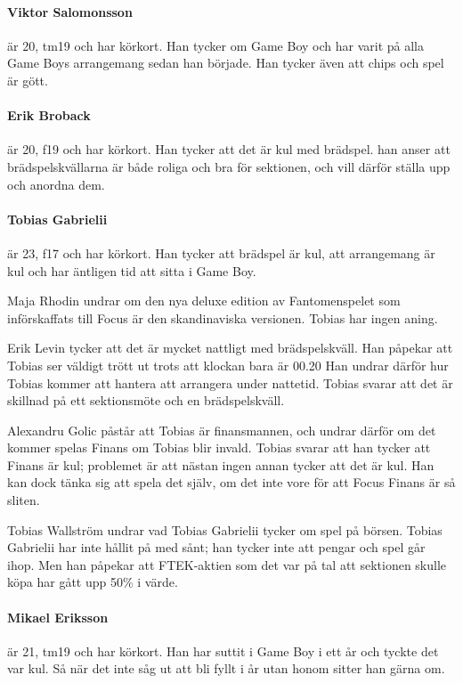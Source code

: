 \documentclass[hidelinks]{sektionsmote}
\begin{document}
\paragraph{Viktor Salomonsson} är 20, tm19 och har körkort.
Han tycker om Game Boy och har varit på alla Game Boys arrangemang sedan han började.
Han tycker även att chips och spel är gött.

\paragraph{Erik Broback} är 20, f19 och har körkort.
Han tycker att det är kul med brädspel.
han anser att brädspelskvällarna är både roliga och bra för sektionen, och vill därför ställa upp och anordna dem.

\paragraph{Tobias Gabrielii} är 23, f17 och har körkort.
Han tycker att brädspel är kul, att arrangemang är kul och har äntligen tid att sitta i Game Boy.

Maja Rhodin undrar om den nya deluxe edition av Fantomenspelet som införskaffats till Focus är den skandinaviska versionen.
Tobias har ingen aning.

Erik Levin tycker att det är mycket nattligt med brädspelskväll.
Han påpekar att Tobias ser väldigt trött ut trots att klockan bara är 00.20
Han undrar därför hur Tobias kommer att hantera att arrangera under nattetid.
Tobias svarar att det är skillnad på ett sektionsmöte och en brädspelskväll.

Alexandru Golic påstår att Tobias är finansmannen, och undrar därför om det kommer spelas Finans om Tobias blir invald.
Tobias svarar att han tycker att Finans är kul; problemet är att nästan ingen annan tycker att det är kul.
Han kan dock tänka sig att spela det själv, om det inte vore för att Focus Finans är så sliten.

Tobias Wallström undrar vad Tobias Gabrielii tycker om spel på börsen.
Tobias Gabrielii har inte hållit på med sånt; han tycker inte att pengar och spel går ihop.
Men han påpekar att FTEK-aktien som det var på tal att sektionen skulle köpa har gått upp 50\% i värde.

\paragraph{Mikael Eriksson} är 21, tm19 och har körkort.
Han har suttit i Game Boy i ett år och tyckte det var kul.
Så när det inte såg ut att bli fyllt i år utan honom sitter han gärna om.
\end{document}
